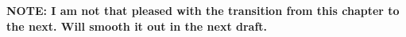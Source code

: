 \documentclass[../main.tex]{subfiles}
\begin{document}
\vspace{\baselineskip}
\textbf{NOTE: I am not that pleased with the transition from this chapter to the next. Will smooth it out in the next draft.}\par


\vspace{\baselineskip}

\vspace{\baselineskip}

\vspace{\baselineskip}

\vspace{\baselineskip}
\end{document}

